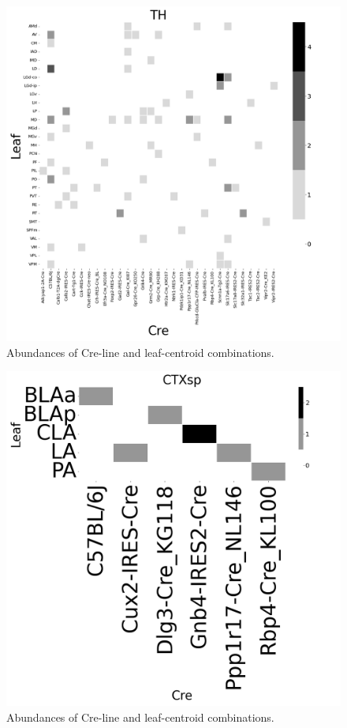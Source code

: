 \begin{figure}[H]
    \centering
    \includegraphics[width = 7in]{figs/TH centroid density.png}
    \caption{Abundances of Cre-line and leaf-centroid combinations.}
    \label{fig:my_label}
\end{figure}
\newpage

\begin{figure}[H]
    \centering
    \includegraphics[width = 7in]{figs/CTXsp centroid density.png}
    \caption{Abundances of Cre-line and leaf-centroid combinations.}
    \label{fig:my_label}
\end{figure}
\newpage

